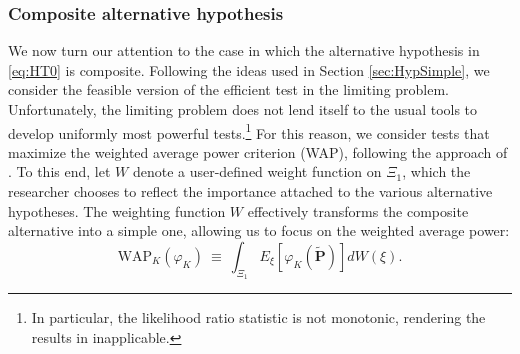 \subsubsection{Composite alternative hypothesis}\label{sec:HypComp}

We now turn our attention to the case in which the alternative hypothesis in \eqref{eq:HT0} is composite. Following the ideas used in Section \ref{sec:HypSimple}, we consider the feasible version of the efficient test in the limiting problem. Unfortunately, the limiting problem does not lend itself to the usual tools to develop uniformly most powerful tests.\footnote{In particular, the likelihood ratio statistic is not monotonic, rendering the results in \citet[Section 3.4]{Lehman/Romano:2005} inapplicable.} For this reason, we consider tests that maximize the weighted average power criterion (WAP), following the approach of \cite{wald:1943,andrews/ploberger:1994}. To this end, let $W$ denote a user-defined weight function on $\Xi _{1}$, which the researcher chooses to reflect the importance attached to the various alternative hypotheses. The weighting function $W$ effectively transforms the composite alternative into a simple one, allowing us to focus on the weighted average power:
\begin{equation*}
\mathrm{WAP}_{K}( \varphi _{K}) ~\equiv ~\int_{\Xi _{1}}E_{\xi } [ \varphi _{K}( \mathbf{\tilde{P}}) ] dW( \xi ) .
\end{equation*}

